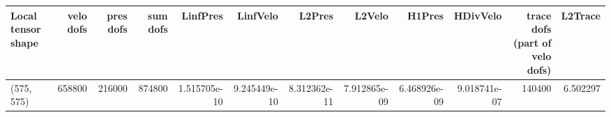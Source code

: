 \begin{tabular}{lrrrrrrrrrrr}
\toprule
Local tensor shape &  velo dofs &  pres dofs &  sum dofs &     LinfPres &     LinfVelo &       L2Pres &       L2Velo &       H1Pres &     HDivVelo &  trace dofs (part of velo dofs) &  L2Trace \\
\midrule
        (575, 575) &     658800 &     216000 &    874800 & 1.515705e-10 & 9.245449e-10 & 8.312362e-11 & 7.912865e-09 & 6.468926e-09 & 9.018741e-07 &                          140400 & 6.502297 \\
\bottomrule
\end{tabular}
